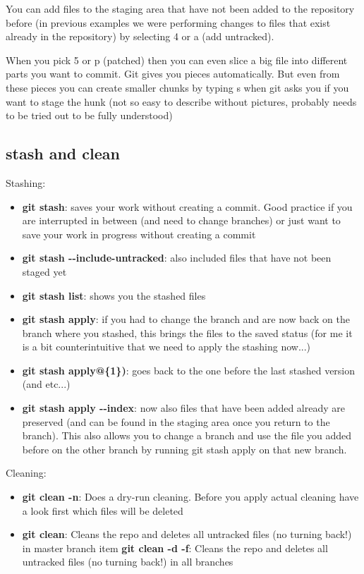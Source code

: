 \documentclass[12pt]{article}
\begin{document}
You can add files to the staging area that have not been added to the repository before (in previous examples we were performing changes to files that exist already in the repository) by selecting 4 or a (add untracked). 
 
When you pick 5 or p (patched) then you can even slice a big file into different parts you want to commit. Git gives you pieces automatically. But even from these pieces you can create smaller chunks by typing s when git asks you if you want to stage the hunk (not so easy to describe without pictures, probably needs to be tried out to be fully understood)

\subsection{stash and clean}
Stashing:
\begin {itemize}
\item \textbf{git stash}: saves your work without creating a commit. Good practice if you are interrupted in between (and need to change branches) or just want to save your work in progress without creating a commit
\item \textbf{git stash \textrm{-}\textrm{-}include-untracked}: also included files that have not been staged yet
\item \textbf{git stash list}: shows you the stashed files
\item \textbf{git stash apply}: if you had to change the branch and are now back on the branch where you stashed, this brings the files to the saved status (for me it is a bit counterintuitive that we need to apply the stashing now...)
\item \textbf{git stash apply@\{1\})}: goes back to the one before the last stashed version (and etc...)
\item \textbf{git stash apply \textrm{-}\textrm{-}index}: now also files that have been added already are preserved (and can be found in the staging area once you return to the branch). This also allows you to change a branch and use the file you added before on the other branch by running git stash apply on that new branch.
\end{itemize}

Cleaning: 
\begin {itemize}
\item \textbf{git clean -n}: Does a dry-run cleaning. Before you apply actual cleaning have a look first which files will be deleted
\item \textbf{git clean}: Cleans the repo and deletes all untracked files (no turning back!) in master branch
item \textbf{git clean -d -f}: Cleans the repo and deletes all untracked files (no turning back!) in all branches
\end{itemize}
\end{document}
